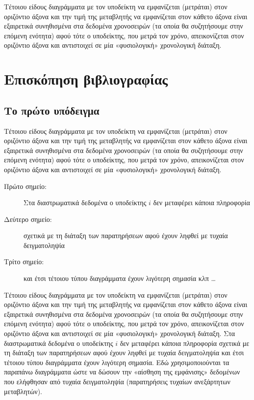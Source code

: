 \documentclass[12pt,a4paper,oneside]{book}
\begin{document}
Τέτοιου είδους διαγράμματα με τον υποδείκτη να εμφανίζεται (μετράται) στον οριζόντιο άξονα και την τιμή της μεταβλητής να εμφανίζεται στον κάθετο άξονα είναι εξαιρετικά συνηθισμένα στα δεδομένα χρονοσειρών (τα οποία θα συζητήσουμε στην επόμενη ενότητα) αφού τότε ο υποδείκτης, που μετρά τον χρόνο, απεικονίζεται στον οριζόντιο άξονα και αντιστοιχεί σε μία «φυσιολογική» χρονολογική διάταξη.

\newpage
\chapter{Επισκόπηση βιβλιογραφίας}
\section{Το πρώτο υπόδειγμα}
Τέτοιου είδους διαγράμματα με τον υποδείκτη να εμφανίζεται (μετράται) στον οριζόντιο άξονα και την τιμή της μεταβλητής να εμφανίζεται στον κάθετο άξονα είναι εξαιρετικά συνηθισμένα στα δεδομένα χρονοσειρών (τα οποία θα συζητήσουμε στην επόμενη ενότητα) αφού τότε ο υποδείκτης, που μετρά τον χρόνο, απεικονίζεται στον οριζόντιο άξονα και αντιστοιχεί σε μία «φυσιολογική» χρονολογική διάταξη.
\begin{description}
	\item[Πρώτο σημείο:] Στα διαστρωματικά δεδομένα ο υποδείκτης $i$ δεν μεταφέρει κάποια πληροφορία
	\item[Δεύτερο σημείο:] σχετικά με τη διάταξη των παρατηρήσεων αφού έχουν ληφθεί με τυχαία δειγματοληψία
	\item[Τρίτο σημείο:] και έτσι τέτοιου τύπου διαγράμματα έχουν λιγότερη σημασία κλπ \ldots
\end{description}
Τέτοιου είδους διαγράμματα με τον υποδείκτη να εμφανίζεται (μετράται) στον οριζόντιο άξονα και την τιμή της μεταβλητής να εμφανίζεται στον κάθετο άξονα είναι εξαιρετικά συνηθισμένα στα δεδομένα χρονοσειρών (τα οποία θα συζητήσουμε στην επόμενη ενότητα) αφού τότε ο υποδείκτης, που μετρά τον χρόνο, απεικονίζεται στον οριζόντιο άξονα και αντιστοιχεί σε μία «φυσιολογική» χρονολογική διάταξη. Στα διαστρωματικά δεδομένα ο υποδείκτης $i$ δεν μεταφέρει κάποια πληροφορία σχετικά με τη διάταξη των παρατηρήσεων αφού έχουν ληφθεί με τυχαία δειγματοληψία και έτσι τέτοιου τύπου διαγράμματα έχουν λιγότερη σημασία. Εδώ χρησιμοποιούνται τα παραπάνω διαγράμματα ώστε να δώσουν την «αίσθηση της εμφάνισης» δεδομένων που ελήφθησαν από τυχαία δειγματοληψία (παρατηρήσεις τυχαίων ανεξάρτητων μεταβλητών).
\end{document}
